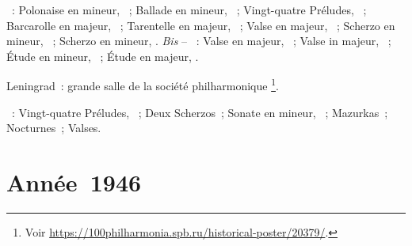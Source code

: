 \begin{description}
 \textsc{\Chopin{}}~: Polonaise en \kC \Sharp mineur,  ~;
 Ballade en \kG mineur, ~; Vingt-quatre Préludes, ~;
 Barcarolle en \kF \Sharp majeur, ~; Tarentelle en \kA \Flat
 majeur, ~; Valse  en \kA \Flat majeur, 
 ~; Scherzo en \kB \Flat mineur, ~; Scherzo en \kB
 mineur, .
 \emph{Bis} -- \textsc{\Chopin{}}~: Valse  en \kG \Flat majeur,
  ~; Valse  in \kA \Flat majeur, 
 ~; Étude en \kC \Sharp mineur,  ~; Étude en
 \kF majeur,  .
 \item[\DateWithWeekDay{1945-12-21}]
 Leningrad~: grande salle de la société philharmonique%
 \footnote{Voir
 \href{https://100philharmonia.spb.ru/historical-poster/20379/}%
 {https://100philharmonia.spb.ru/historical-poster/20379/}.}.

 \textsc{\Chopin{}}~: Vingt-quatre Préludes, ~; Deux Scherzos~;
 Sonate  en \kB mineur, ~; Mazurkas~; Nocturnes~; Valses.
\end{description}

\section{Année~1946}

